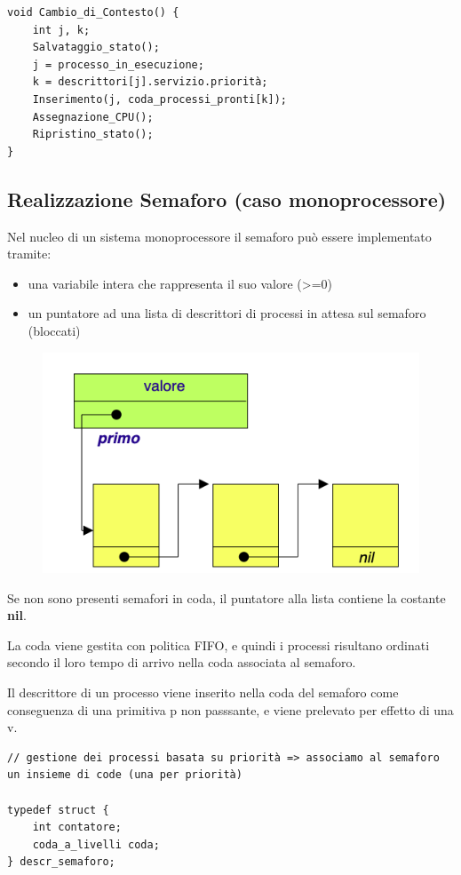 \documentclass{article}
\begin{document}
\begin{lstlisting}
void Cambio_di_Contesto() {
    int j, k;
    Salvataggio_stato();
    j = processo_in_esecuzione;
    k = descrittori[j].servizio.priorità;
    Inserimento(j, coda_processi_pronti[k]);
    Assegnazione_CPU();
    Ripristino_stato();
}
\end{lstlisting}

\subsection{Realizzazione Semaforo (caso monoprocessore)}

Nel nucleo di un sistema monoprocessore il semaforo può essere implementato tramite:
\begin{itemize}
    \item una variabile intera che rappresenta il suo valore (>=0)
    \item un puntatore ad una lista di descrittori di processi in attesa sul semaforo (bloccati)
\end{itemize}

\begin{figure}[htbp]
    \centering
    \includegraphics[width=0.60\columnwidth]{imgs/sem_kernel.png}
\end{figure}

\vspace{3mm}
Se non sono presenti semafori in coda, il puntatore alla lista contiene la costante \textbf{nil}.

La coda viene gestita con politica FIFO, e quindi i processi risultano ordinati secondo il loro tempo di arrivo nella coda associata
al semaforo.

Il descrittore di un processo viene inserito nella coda del semaforo come conseguenza di una primitiva p non passsante, e viene prelevato
per effetto di una v.

\vspace{3mm}
\begin{lstlisting}
// gestione dei processi basata su priorità => associamo al semaforo un insieme di code (una per priorità)

typedef struct {
    int contatore;
    coda_a_livelli coda;
} descr_semaforo;
\end{lstlisting}
\end{document}
